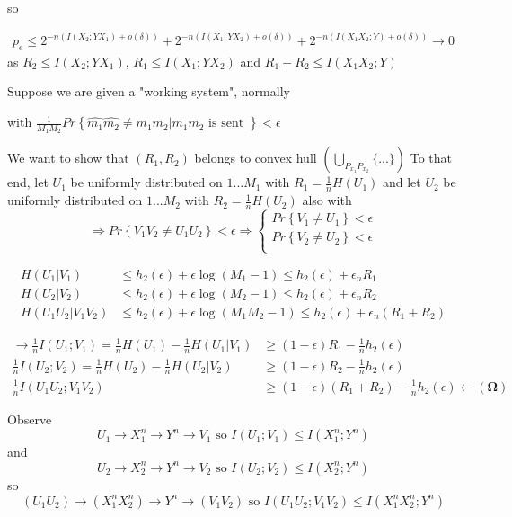 \documentclass[twoside]{article}
\theoremstyle{definition} %
\renewcommand{\Pr}[1]{Pr\left\{#1\right\}}
\begin{document}
so

\begin{align*}
  p_e \leq 2^{-n(I(X_2;YX_1) + o(\delta))} + 2^{-n(I(X_1;YX_2) + o(\delta))} + 2^{-n(I(X_1X_2;Y) + o(\delta))} \to 0
\end{align*}
as $R_2\leq I(X_2;YX_1)$, $R_1\leq I(X_1;YX_2)$ and $R_1 + R_2\leq I(X_1X_2;Y)$



Suppose we are given a "working system", normally

with $\frac{1}{M_1 M_2} \Pr{\hat{m_1}\hat{m_2} \neq m_1 m_2 | m_1 m_2 \text{ is sent }} < \epsilon$

We want to show that $(R_1, R_2)$ belongs to convex hull $(\bigcup_{P_{x_1} P_{x_2}} \{...\})$
To that end, let $U_1$ be uniformly distributed on ${1 ... M_1}$ with $R_1 = \frac{1}{n} H(U_1)$ and let $U_2$ be uniformly distributed on ${1 ... M_2}$ with $R_2 = \frac{1}{n} H(U_2)$
also with
\[
  \Rightarrow \Pr{V_1 V_2 \neq U_1 U_2} < \epsilon \Rightarrow
  \left\{
  \begin{array}{c}
    \Pr{V_1 \neq U_1} < \epsilon \\
    \Pr{V_2 \neq U_2} < \epsilon \\
  \end{array}
  \right.
\]


\begin{align*}
  H(U_1 | V_1) &\leq h_2(\epsilon) + \epsilon \log(M_1 - 1) \leq h_2(\epsilon) + \epsilon_n R_1 \\
  H(U_2 | V_2) &\leq h_2(\epsilon) + \epsilon \log(M_2 - 1) \leq h_2(\epsilon) + \epsilon_n R_2 \\
  H(U_1 U_2 | V_1 V_2) &\leq h_2(\epsilon) + \epsilon \log(M_1 M_2 - 1) \leq h_2(\epsilon) + \epsilon_n (R_1 + R_2)
\end{align*}

\begin{align*}
  \rightarrow \frac{1}{n} I(U_1; V_1) = \frac{1}{n} H(U_1) - \frac{1}{n} H(U_1 | V_1) &\geq (1 - \epsilon) R_1 - \frac{1}{n} h_2(\epsilon)\\
  \frac{1}{n} I(U_2; V_2) = \frac{1}{n} H(U_2) - \frac{1}{n} H(U_2 | V_2) &\geq (1 - \epsilon) R_2 - \frac{1}{n} h_2(\epsilon) \\
  \frac{1}{n} I(U_1 U_2; V_1 V_2) &\geq (1 - \epsilon) (R_1 + R_2) - \frac{1}{n} h_2(\epsilon) \leftarrow \mathbf{(\Omega)}
\end{align*}

Observe
\[
  U_1 \rightarrow X_1^n \rightarrow Y^n \rightarrow V_1 \text{ so } I(U_1 ; V_1) \leq I(X_1^n; Y^n)
\]
and
\[
  U_2 \rightarrow X_2^n \rightarrow Y^n \rightarrow V_2 \text{ so } I(U_2 ; V_2) \leq I(X_2^n; Y^n)
\]
so
\[
  (U_1 U_2) \rightarrow (X_1^n X_2^n) \rightarrow Y^n \rightarrow (V_1 V_2) \text{ so } I(U_1 U_2 ; V_1 V_2) \leq I(X_1^n X_2^n; Y^n)
\]
\end{document}
